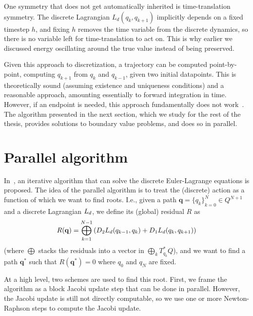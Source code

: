 One symmetry that does not get automatically inherited is time-translation symmetry. The discrete Lagrangian $L_d(q_k, q_{k+1})$ implicitly depends on a fixed timestep $h$, and fixing $h$ removes the time variable from the discrete dynamics, so there is no variable left for time-translation to act on. This is why earlier we discussed energy oscillating around the true value instead of being preserved.


\bigskip

Given this approach to discretization, a trajectory can be computed point-by-point, computing $q_{k+1}$ from $q_k$ and $q_{k-1}$, given two initial datapoints. This is theoretically sound (assuming existence and uniqueness conditions) and a reasonable approach, amounting essentially to forward integration in time. However, if an endpoint is needed, this approach fundamentally does not work~\cite[p. 6]{ferraroParallelIterativeMethod2025}. The algorithm presented in the next section, which we study for the rest of the thesis, provides solutions to boundary value problems, and does so in parallel.

\section{Parallel algorithm}\label{sec:parallel-algorithm}

In~\cite{ferraroParallelIterativeMethod2025}, an iterative algorithm that can solve the discrete Euler-Lagrange equations is proposed. The idea of the parallel algorithm is to treat the (discrete) action as a function of which we want to find roots. I.e., given a path $\mathbf{q} = {\{q_k\}}_{k=0}^N \in Q^{N+1}$ and a discrete Lagrangian $L_d$, we define its (global) residual $R$ as
\begin{equation}
	R(\mathbf{q}) = \bigoplus_{k=1}^{N-1}
	\left(D_{2} L_d (q_{k-1}, q_k) + D_{1} L_d (q_k, q_{k+1})\right)
	\label{eq:residual-global}
\end{equation}
(where $\bigoplus$ stacks the residuals into a vector in $\bigoplus_k T^*_{q_k}Q$), and we want to find a path $\mathbf{q}^*$ such that $R(\mathbf{q}^*) = 0$ where $q_0$ and $q_N$ are fixed.

At a high level, two schemes are used to find this root. First, we frame the algorithm as a block Jacobi update step that can be done in parallel. However, the Jacobi update is still not directly computable, so we use one or more Newton-Raphson steps to compute the Jacobi update.


